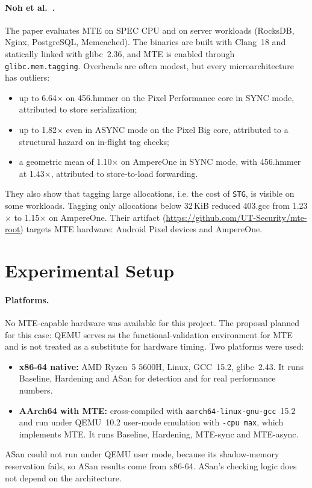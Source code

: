 \documentclass[11pt,a4paper]{article}
\begin{document}
\paragraph{Noh et al.~\cite{noh26}.}
The paper evaluates MTE on SPEC CPU and on server workloads (RocksDB, Nginx, PostgreSQL, Memcached).
The binaries are built with Clang~18 and statically linked with glibc~2.36, and MTE is enabled through \texttt{glibc.mem.tagging}.
Overheads are often modest, but every microarchitecture has outliers:
\begin{itemize}[itemsep=1pt]
\item up to 6.64$\times$ on 456.hmmer on the Pixel Performance core in SYNC mode, attributed to store serialization;
\item up to 1.82$\times$ even in ASYNC mode on the Pixel Big core, attributed to a structural hazard on in-flight tag checks;
\item a geometric mean of 1.10$\times$ on AmpereOne in SYNC mode, with 456.hmmer at 1.43$\times$, attributed to store-to-load forwarding.
\end{itemize}
They also show that tagging large allocations, i.e. the cost of \texttt{STG}, is visible on some workloads.
Tagging only allocations below 32\,KiB reduced 403.gcc from 1.23$\times$ to 1.15$\times$ on AmpereOne.
Their artifact (\url{https://github.com/UT-Security/mte-root}) targets MTE hardware: Android Pixel devices and AmpereOne.

\section{Experimental Setup}
\label{sec:setup}
\paragraph{Platforms.}
No MTE-capable hardware was available for this project.
The proposal planned for this case: QEMU serves as the functional-validation environment for MTE and is not treated as a substitute for hardware timing.
Two platforms were used:
\begin{itemize}[itemsep=1pt]
\item \textbf{x86-64 native:} AMD Ryzen~5 5600H, Linux, GCC~15.2, glibc~2.43.
It runs Baseline, Hardening and ASan for detection and for real performance numbers.
\item \textbf{AArch64 with MTE:} cross-compiled with \texttt{aarch64-linux-gnu-gcc}~15.2 and run under QEMU~10.2 user-mode emulation with \texttt{-cpu max}, which implements MTE.
It runs Baseline, Hardening, MTE-sync and MTE-async.
\end{itemize}
ASan could not run under QEMU user mode, because its shadow-memory reservation fails, so ASan results come from x86-64.
ASan's checking logic does not depend on the architecture.
\end{document}
